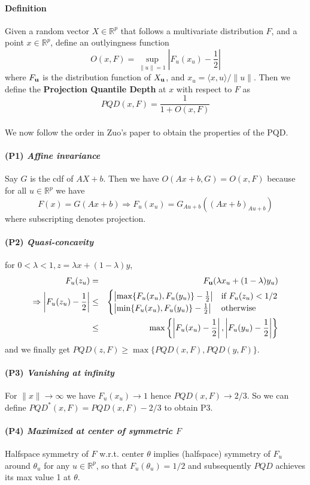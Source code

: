 \documentclass{article}
\begin{document}
\paragraph{Definition}
Given a random vector $X\in \mathbb{R}^p$ that follows a multivariate distribution $F$, and a point $x\in\mathbb{R}^p$, define an outlyingness function
$$ O(x,F) = \sup_{\|u\|=1} \left\vert F_u(x_u)-\frac{1}{2}\right\vert $$
where $F_{\bf{u}}$ is the distribution function of $X_{\bf{u}}$, and $x_u=\langle x,u\rangle/\|u\| $. Then we define the \textbf{Projection Quantile Depth} at $x$ with respect to $F$ as
$$ PQD(x,F) = \frac{1}{1+O(x,F)} $$

\paragraph{}We now follow the order in Zuo's paper to obtain the properties of the PQD.

\paragraph{(P1) \textit{Affine invariance}} Say $G$ is the cdf of $AX+b$. Then we have $O(Ax+b,G)=O(x,F)$ because for all $u\in\mathbb{R}^p$ we have
$$ F(x)= G(Ax+b) \Rightarrow F_u(x_u) = G_{Au+b}\left((Ax+b)_{Au+b}\right)$$
where subscripting denotes projection.

\paragraph{(P2) \textit{Quasi-concavity}} for $0<\lambda<1, z=\lambda x+(1-\lambda)y$,
\begin{eqnarray*}
F_u(z_u) &=& F_{\bf{u}} (\lambda x_u+(1-\lambda)y_u)\\
\Rightarrow \left\vert F_u(z_u)-\frac{1}{2}\right\vert &\leq &
\begin{cases}
\left\vert \max\{F_u(x_u),F_u(y_u)\}-\frac{1}{2}\right\vert & \mbox{if } F_u(z_u)<1/2\\
\left\vert \min\{F_u(x_u),F_u(y_u)\}-\frac{1}{2}\right\vert & \mbox{otherwise}
\end{cases}\\
&\leq & \max\left\lbrace \left\vert F_u(x_u)-\frac{1}{2}\right\vert, \left\vert F_u(y_u)-\frac{1}{2}\right\vert \right\rbrace
\end{eqnarray*}
and we finally get $PQD(z,F)\geq\max\{PQD(x,F),PQD(y,F)\}$.

\paragraph{(P3) \textit{Vanishing at infinity}}For $\|x\|\rightarrow\infty$ we have $F_u(x_u)\rightarrow 1$ hence $PQD(x,F)\rightarrow 2/3$. So we can define $PQD^*(x,F)=PQD(x,F)-2/3$ to obtain P3.

\paragraph{(P4) \textit{Maximized at center of symmetric $F$}} Halfspace symmetry of $F$ w.r.t. center $\theta$ implies (halfspace) symmetry of $F_u$ around $\theta_u$ for any $u\in\mathbb{R}^p$, so that $F_u(\theta_u)=1/2$ and subsequently $PQD$ achieves its max value 1 at $\theta$.
\end{document}
